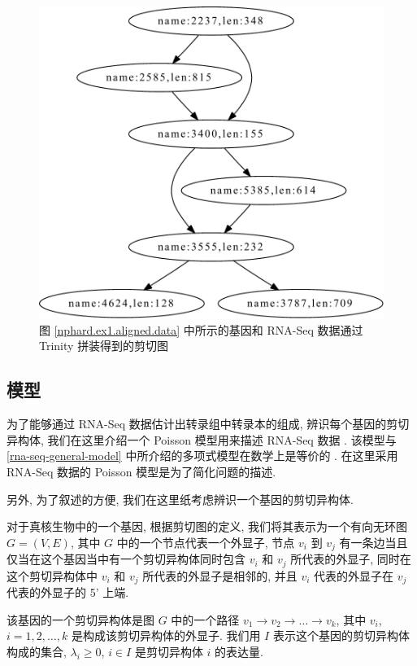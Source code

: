 \begin{figure}[!t]
\centering
\includegraphics[width=\textwidth]{figures/nphard/comp1.pdf}
\caption{图 \ref{nphard.ex1.aligned.data} 中所示的基因和 
RNA-Seq 数据通过 Trinity \cite{grabherr2011full} 拼装得到的剪切图}
\label{nphard.ex1.splicing.graph}
\end{figure}

\subsection{模型}
\label{nphard-model}

为了能够通过 RNA-Seq 数据估计出转录组中转录本的组成, 辨识每个基因的剪切异构体, 
我们在这里介绍一个 Poisson 模型用来描述 RNA-Seq 数据 \cite{Jiang15042009}. 
该模型与 \ref{rna-seq-general-model} 中所介绍的多项式模型在数学上是等价的 
\cite{2011arXiv1104.3889P}. 
在这里采用 RNA-Seq 数据的 Poisson 模型是为了简化问题的描述. 

另外, 为了叙述的方便, 我们在这里纸考虑辨识一个基因的剪切异构体. 

对于真核生物中的一个基因, 根据剪切图的定义, 
我们将其表示为一个有向无环图 $G=(V,E)$, 其中 $G$ 中的一个节点代表一个外显子, 
节点 $v_i$ 到 $v_j$ 有一条边当且仅当在这个基因当中有一个剪切异构体同时包含 
$v_i$ 和 $v_j$ 所代表的外显子, 
同时在这个剪切异构体中 $v_i$ 和 $v_j$ 所代表的外显子是相邻的, 
并且 $v_i$ 代表的外显子在 $v_j$ 代表的外显子的 5' 上端. 

该基因的一个剪切异构体是图 $G$ 中的一个路径 $v_1 \to v_2 \to \ldots \to v_k$, 
其中 $v_i$, $i=1,2,\ldots,k$ 是构成该剪切异构体的外显子. 
我们用 $I$ 表示这个基因的剪切异构体构成的集合, $\lambda_i \geq 0$, 
$i \in I$ 是剪切异构体 $i$ 的表达量. 

